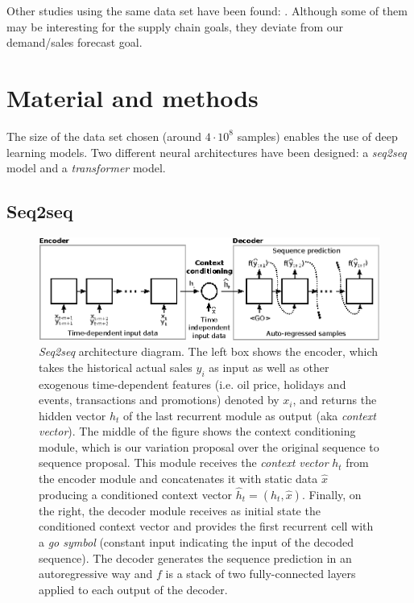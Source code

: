 Other studies using the same data set have been found: \autocite{wang2020c, Shaikhha2020, Schleich2019, Lim2019, Curtin2020, Malik2019, Kuleshov2018, Khamis2020}. Although some of them may be interesting for the supply chain goals, they deviate from our demand/sales forecast goal.

\section{Material and methods} \label{sec:salesforecast_methods}
The size of the data set chosen (around $4\cdot10^8$ samples) enables the use of deep learning models. Two different neural architectures have been designed: a \textit{seq2seq} model and a \textit{transformer} model.

\subsection{Seq2seq}  %

\begin{figure}
	\centering
	\includegraphics[width=1\linewidth]{salesforecast/images/s2s}
	\caption{\textit{Seq2seq} architecture diagram. The left box shows the encoder, which takes the historical actual sales $y_i$ as input as well as other exogenous time-dependent features (i.e. oil price, holidays and events, transactions and promotions) denoted by $x_i$, and returns the hidden vector $h_t$ of the last recurrent module as output (aka \textit{context vector}). The middle of the figure shows the context conditioning module, which is our variation proposal over the original sequence to sequence proposal. This module receives the \textit{context vector} $h_t$ from the encoder module and concatenates it with static data $\hat{x}$ producing a conditioned context vector $\hat{h}_t = (h_t, \hat{x})$. Finally, on the right, the decoder module receives as initial state the conditioned context vector and provides the first recurrent cell with a \textit{go symbol} (constant input indicating the input of the decoded sequence). The decoder generates the sequence prediction in an autoregressive way and $f$ is a stack of two fully-connected layers applied to each output of the decoder.}
	\label{fig:s2s}
\end{figure}


